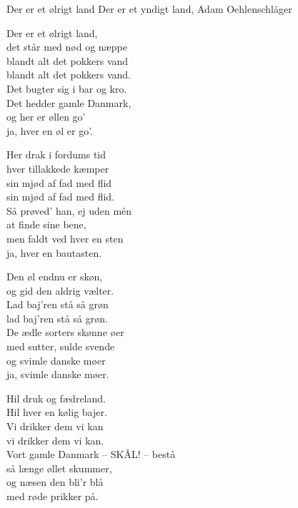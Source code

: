 \begin{song}{Der er et ølrigt land}
  {} %
  {Der er et yndigt land, Adam Oehlenschläger} %
  {} %
  {} %
  {\NotCCLIed} %

  \begin{SBVerse}
    Der er et ølrigt land,\\
    det står med nød og næppe\\
    blandt alt det pokkers vand\\
    blandt alt det pokkers vand.\\
    Det bugter sig i bar og kro.\\
    Det hedder gamle Danmark,\\
    og her er øllen go'\\
    ja, hver en øl er go'.
  \end{SBVerse}

  \begin{SBVerse}
    Her drak i fordums tid\\
    hver tillakkede kæmper\\
    sin mjød af fad med flid\\
    sin mjød af fad med flid.\\
    Så prøved' han, ej uden mén\\
    at finde sine bene,\\
    men faldt ved hver en sten\\
    ja, hver en bautasten.
  \end{SBVerse}

  \begin{SBVerse}
    Den øl endnu er skøn,\\
    og gid den aldrig vælter.\\
    Lad baj'ren stå så grøn\\
    lad baj'ren stå så grøn.\\
    De ædle sorters skønne øer\\
    med sutter, sulde svende\\
    og svimle danske møer\\
    ja, svimle danske møer.
  \end{SBVerse}

  \begin{SBVerse}
    Hil druk og fædreland.\\
    Hil hver en kølig bajer.\\
    Vi drikker dem vi kan\\
    vi drikker dem vi kan.\\
    Vort gamle Danmark -- SKÅL! -- bestå\\
    så længe øllet skummer,\\
    og næsen den bli'r blå\\
    med røde prikker på.
  \end{SBVerse}
\end{song}